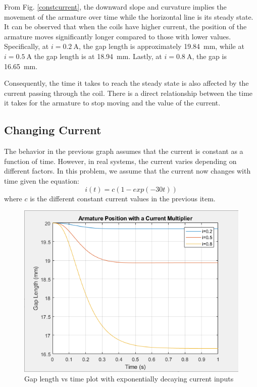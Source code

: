 \documentclass[conference]{IEEEtran}
\begin{document}
From Fig. \ref{constcurrent}, the downward slope and curvature implies the movement of the armature over time while the horizontal line is its steady state. It can be observed that when the coils have higher current, the position of the armature moves significantly longer compared to those with lower values. Specifically, at $i=\SI{0.2}{\ampere}$, the gap length is approximately \SI{19.84}{\milli\meter}, while at $i=\SI{0.5}{\ampere}$ the gap length is at \SI{18.94}{\milli\meter}. Lastly, at $i=\SI{0.8}{\ampere}$, the gap is \SI{16.65}{\milli\meter}.

Consequently, the time it takes to reach the steady state is also affected by the current passing through the coil. There is a direct relationship between the time it takes for the armature to stop moving and the value of the current. 

\subsection{Changing Current}

The behavior in the previous graph assumes that the current is constant as a function of time. However, in real systems, the current varies depending on different factors. In this problem, we assume that the current now changes with time given the equation:
\begin{equation} \label{changingcurrent}
    i(t)=c(1-exp(-30t))
\end{equation}
where $c$ is the different constant current values in the previous item.

\begin{figure}[b]
    \begin{centering}
    \includegraphics[width=\linewidth]{q3.png}
    \caption{Gap length vs time plot with exponentially decaying current inputs}
    \label{expcurrent}
    \end{centering}
\end{figure}
\end{document}
